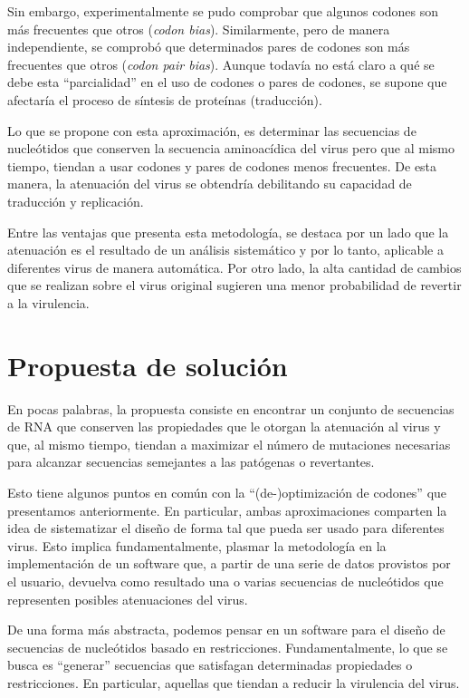 Sin embargo, experimentalmente se pudo comprobar que algunos codones son m\'as
frecuentes que otros (\textit{codon bias}). Similarmente, pero de manera
independiente, se comprob\'o que determinados pares de codones son m\'as
frecuentes que otros (\textit{codon pair bias}). Aunque todav\'ia no est\'a
claro a qu\'e se debe esta ``parcialidad'' en el uso de codones o pares de
codones, se supone que afectar\'ia el proceso de s\'intesis de prote\'inas
(traducci\'on). 

Lo que se propone con esta aproximaci\'on, es determinar las secuencias de
nucle\'otidos que conserven la secuencia aminoac\'idica del virus pero que al
mismo tiempo, tiendan a usar codones y pares de codones menos frecuentes. De
esta manera, la atenuaci\'on del virus se obtendr\'ia debilitando su capacidad
de traducci\'on y replicaci\'on. 

Entre las ventajas que presenta esta metodolog\'ia, se destaca por un lado que
la atenuaci\'on es el resultado de un an\'alisis sistem\'atico y por lo tanto,
aplicable a diferentes virus de manera autom\'atica. Por otro lado, la alta
cantidad de cambios que se realizan sobre el virus original sugieren una menor
probabilidad de revertir a la virulencia.

\section{Propuesta de soluci\'on}
\label{vacunas-propuesta}

En pocas palabras, la propuesta consiste en encontrar un conjunto de secuencias
de \ac{RNA} que conserven las propiedades que le otorgan la atenuaci\'on al
virus y que, al mismo tiempo, tiendan a maximizar el n\'umero de mutaciones
necesarias para alcanzar secuencias semejantes a las pat\'ogenas o revertantes.

Esto tiene algunos puntos en com\'un con la ``(de-)optimizaci\'on de codones''
que presentamos anteriormente. En particular, ambas aproximaciones comparten la
idea de sistematizar el dise\~no de forma tal que pueda ser usado para
diferentes virus. Esto implica fundamentalmente, plasmar la metodolog\'ia en la
implementaci\'on de un software que, a partir de una serie de datos provistos
por el usuario, devuelva como resultado una o varias secuencias de nucle\'otidos
que representen posibles atenuaciones del virus.

De una forma m\'as abstracta, podemos pensar en un software para el dise\~no de
secuencias de nucle\'otidos basado en restricciones. Fundamentalmente, lo que se
busca es ``generar'' secuencias que satisfagan determinadas propiedades o
restricciones. En particular, aquellas que tiendan a reducir la virulencia del
virus.

